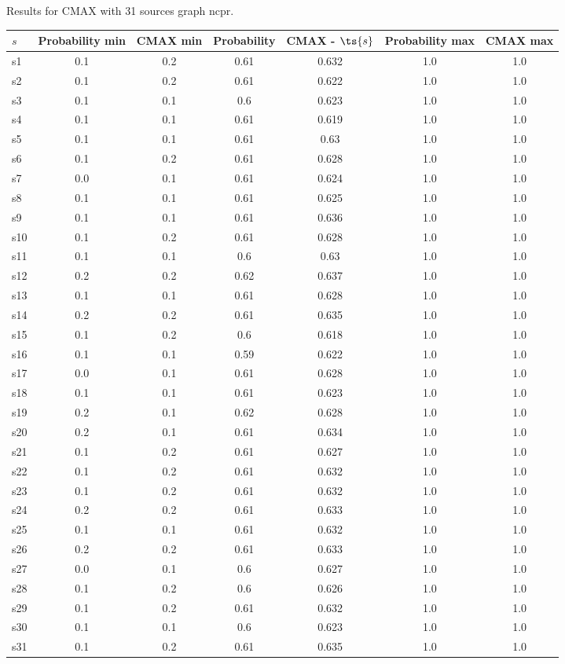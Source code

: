 \documentclass{article}
\begin{document}
\noindent Results for CMAX with 31 sources graph ncpr.

\noindent\begin{tabular}{|l|c|c|c|c|c|c|}
\hline
$s$& Probability min & CMAX min & Probability & CMAX - $\ts{s}$ & Probability max & CMAX max\\
\hline
s1 &0.1 & 0.2 & 0.61 & 0.632 & 1.0 & 1.0\\
\hline
s2 &0.1 & 0.2 & 0.61 & 0.622 & 1.0 & 1.0\\
\hline
s3 &0.1 & 0.1 & 0.6 & 0.623 & 1.0 & 1.0\\
\hline
s4 &0.1 & 0.1 & 0.61 & 0.619 & 1.0 & 1.0\\
\hline
s5 &0.1 & 0.1 & 0.61 & 0.63 & 1.0 & 1.0\\
\hline
s6 &0.1 & 0.2 & 0.61 & 0.628 & 1.0 & 1.0\\
\hline
s7 &0.0 & 0.1 & 0.61 & 0.624 & 1.0 & 1.0\\
\hline
s8 &0.1 & 0.1 & 0.61 & 0.625 & 1.0 & 1.0\\
\hline
s9 &0.1 & 0.1 & 0.61 & 0.636 & 1.0 & 1.0\\
\hline
s10 &0.1 & 0.2 & 0.61 & 0.628 & 1.0 & 1.0\\
\hline
s11 &0.1 & 0.1 & 0.6 & 0.63 & 1.0 & 1.0\\
\hline
s12 &0.2 & 0.2 & 0.62 & 0.637 & 1.0 & 1.0\\
\hline
s13 &0.1 & 0.1 & 0.61 & 0.628 & 1.0 & 1.0\\
\hline
s14 &0.2 & 0.2 & 0.61 & 0.635 & 1.0 & 1.0\\
\hline
s15 &0.1 & 0.2 & 0.6 & 0.618 & 1.0 & 1.0\\
\hline
s16 &0.1 & 0.1 & 0.59 & 0.622 & 1.0 & 1.0\\
\hline
s17 &0.0 & 0.1 & 0.61 & 0.628 & 1.0 & 1.0\\
\hline
s18 &0.1 & 0.1 & 0.61 & 0.623 & 1.0 & 1.0\\
\hline
s19 &0.2 & 0.1 & 0.62 & 0.628 & 1.0 & 1.0\\
\hline
s20 &0.2 & 0.1 & 0.61 & 0.634 & 1.0 & 1.0\\
\hline
s21 &0.1 & 0.2 & 0.61 & 0.627 & 1.0 & 1.0\\
\hline
s22 &0.1 & 0.2 & 0.61 & 0.632 & 1.0 & 1.0\\
\hline
s23 &0.1 & 0.2 & 0.61 & 0.632 & 1.0 & 1.0\\
\hline
s24 &0.2 & 0.2 & 0.61 & 0.633 & 1.0 & 1.0\\
\hline
s25 &0.1 & 0.1 & 0.61 & 0.632 & 1.0 & 1.0\\
\hline
s26 &0.2 & 0.2 & 0.61 & 0.633 & 1.0 & 1.0\\
\hline
s27 &0.0 & 0.1 & 0.6 & 0.627 & 1.0 & 1.0\\
\hline
s28 &0.1 & 0.2 & 0.6 & 0.626 & 1.0 & 1.0\\
\hline
s29 &0.1 & 0.2 & 0.61 & 0.632 & 1.0 & 1.0\\
\hline
s30 &0.1 & 0.1 & 0.6 & 0.623 & 1.0 & 1.0\\
\hline
s31 &0.1 & 0.2 & 0.61 & 0.635 & 1.0 & 1.0\\
\hline
\end{tabular}\\
\end{document}
